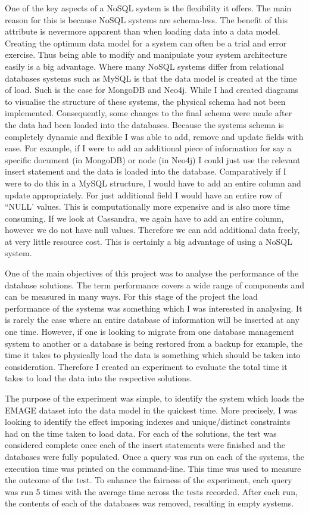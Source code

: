 One of the key aspects of a NoSQL system is the flexibility it offers. The main reason for this is because NoSQL systems are schema-less. The benefit of this attribute is nevermore apparent than when loading data into a data model. Creating the optimum data model for a system can often be a trial and error exercise. Thus being able to modify and manipulate your system architecture easily is a big advantage. Where many NoSQL systems differ from relational databases systems such as MySQL is that the data model is created at the time of load. Such is the case for MongoDB and Neo4j. While I had created diagrams to visualise the structure of these systems, the physical schema had not been implemented. Consequently, some changes to the final schema were made after the data had been loaded into the databases. Because the systems schema is completely dynamic and flexible I was able to add, remove and update fields with ease. For example, if I were to add an additional piece of information for say a specific document (in MongoDB) or node (in Neo4j) I could just use the relevant insert statement and the data is loaded into the database. Comparatively if I were to do this in a MySQL structure, I would have to add an entire column and update appropriately. For just additional field I would have an entire row of ``NULL' values. This is computationally more expensive and is also more time consuming. If we look at Cassandra, we again have to add an entire column, however we do not have null values. Therefore we can add additional data freely, at very little resource cost. This is certainly a big advantage of using a NoSQL system.

One of the main objectives of this project was to analyse the performance of the database solutions. The term performance covers a wide range of components and can be measured in many ways. For this stage of the project the load performance of the systems was something which I was interested in analysing. It is rarely the case where an entire database of information will be inserted at any one time. However, if one is looking to migrate from one database management system to another or a database is being restored from a backup for example, the time it takes to physically load the data is something which should be taken into consideration. Therefore I created an experiment to evaluate the total time it takes to load the data into the respective solutions.

The purpose of the experiment was simple, to identify the system which loads the EMAGE dataset into the data model in the quickest time. More precisely, I was looking to identify the effect imposing indexes and unique/distinct constraints had on the time taken to load data. For each of the solutions, the test was considered complete once each of the insert statements were finished and the databases were fully populated. Once a query was run on each of the systems, the execution time was printed on the command-line. This time was used to measure the outcome of the test. To enhance the fairness of the experiment, each query was run 5 times with the average time across the tests recorded. After each run, the contents of each of the databases was removed, resulting in empty systems.

